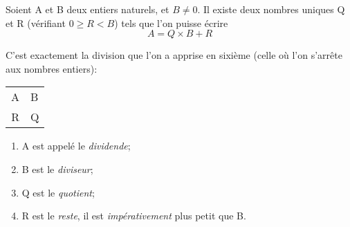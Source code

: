 \documentclass[a4paper,12pt,french]{book}
\begin{document}
\begin{definition}

Soient A et B deux entiers naturels, et $B\neq 0$. Il existe deux nombres uniques Q et R (vérifiant $0\geqslant R<B$) tels que l'on puisse écrire
$$A = Q\times B + R$$

C'est exactement la division que l'on a apprise en sixième (celle où l'on s'arrête aux nombres entiers):
\begin{center}
\begin{tabular}{r|l}
A & B\\
\cline{2-2}
R & Q
\end{tabular}

\begin{enumerate}[\textbullet]
	\item 	A est appelé le \textit{dividende};
	\item 	B est le \textit{diviseur};
	\item	Q est le \textit{quotient};
	\item 	R est le \textit{reste}, il est \textit{impérativement} plus petit que B.
\end{enumerate}
\end{center}
\end{definition}
\end{document}
